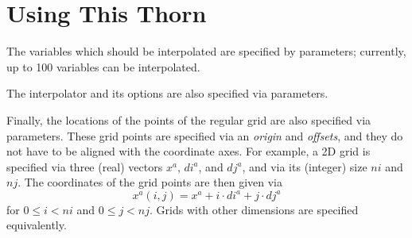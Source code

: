 \section{Using This Thorn}
The variables which should be interpolated are specified by
parameters; currently, up to 100 variables can be interpolated.

The interpolator and its options are also specified via parameters.

Finally, the locations of the points of the regular grid are also
specified via parameters.  These grid points are specified via an
\emph{origin} and \emph{offsets}, and they do not have to be aligned
with the coordinate axes.  For example, a 2D grid is specified via
three (real) vectors $x^a$, $di^a$, and $dj^a$, and via its (integer)
size $ni$ and $nj$.  The coordinates of the grid points are then given
via
$$
x^a(i,j) = x^a + i \cdot di^a + j \cdot dj^a
$$
for $0 \le i < ni$ and $0 \le j < nj$.  Grids with other dimensions
are specified equivalently.




